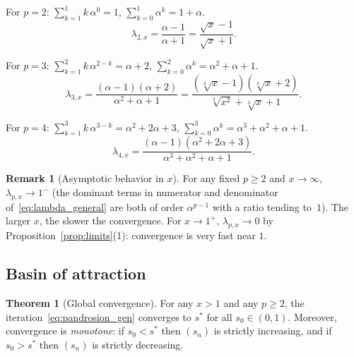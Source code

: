 \documentclass[11pt,a4paper]{article}
\theoremstyle{definition}
\newtheorem{theorem}{Theorem}[section]
\newtheorem{remark}{Remark}[section]
\newcommand{\cbrt}[1]{\sqrt[3]{#1}}
\begin{document}
For $p = 2$: $\sum_{k=1}^{1} k\,\alpha^{0} = 1$, $\sum_{k=0}^{1}\alpha^k = 1 + \alpha$.
\begin{equation}
  \label{eq:lambda2}
  \lambda_{2,x} = \frac{\alpha - 1}{\alpha + 1} = \frac{\sqrt{x} - 1}{\sqrt{x} + 1}.
\end{equation}

For $p = 3$: $\sum_{k=1}^{2} k\,\alpha^{2-k} = \alpha + 2$, $\sum_{k=0}^{2}\alpha^k = \alpha^2+\alpha+1$.
\begin{equation}
  \label{eq:lambda3}
  \lambda_{3,x} = \frac{(\alpha-1)(\alpha+2)}{\alpha^2 + \alpha + 1} = \frac{(\cbrt{x}-1)(\cbrt{x}+2)}{\cbrt{x^2}+\cbrt{x}+1}.
\end{equation}

For $p = 4$: $\sum_{k=1}^{3}k\,\alpha^{3-k} = \alpha^2 + 2\alpha + 3$, $\sum_{k=0}^{3}\alpha^k = \alpha^3+\alpha^2+\alpha+1$.
\begin{equation}
  \label{eq:lambda4}
  \lambda_{4,x} = \frac{(\alpha-1)(\alpha^2+2\alpha+3)}{\alpha^3+\alpha^2+\alpha+1}.
\end{equation}

\begin{remark}[Asymptotic behavior in $x$]
For any fixed $p \geq 2$ and $x \to \infty$, $\lambda_{p,x} \to 1^-$ (the dominant terms in numerator and denominator of~\eqref{eq:lambda_general} are both of order $\alpha^{p-1}$ with a ratio tending to~$1$). The larger $x$, the slower the convergence. For $x \to 1^+$, $\lambda_{p,x} \to 0$ by Proposition~\ref{prop:limits}(1): convergence is very fast near $1$.
\end{remark}

\subsection{Basin of attraction}

\begin{theorem}[Global convergence]
\label{thm:bassin}
For any $x > 1$ and any $p \geq 2$, the iteration~\eqref{eq:pandrosion_gen} converges to $s^*$ for all $s_0 \in (0,1)$. Moreover, convergence is \emph{monotone}: if $s_0 < s^*$ then $(s_n)$ is strictly increasing, and if $s_0 > s^*$ then $(s_n)$ is strictly decreasing.
\end{theorem}
\end{document}

